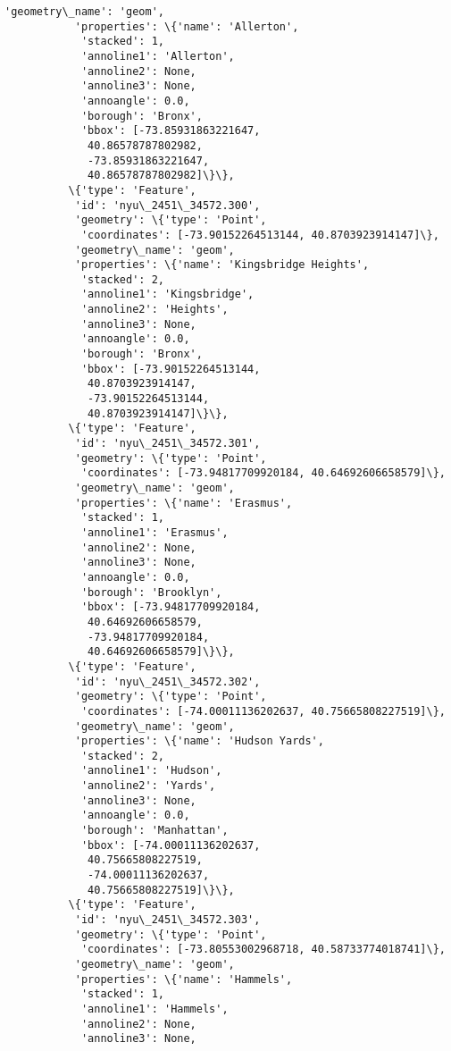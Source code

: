 \documentclass[11pt]{article}
\begin{document}
\begin{Verbatim}[commandchars=\\\{\}]
           'geometry\_name': 'geom',
           'properties': \{'name': 'Allerton',
            'stacked': 1,
            'annoline1': 'Allerton',
            'annoline2': None,
            'annoline3': None,
            'annoangle': 0.0,
            'borough': 'Bronx',
            'bbox': [-73.85931863221647,
             40.86578787802982,
             -73.85931863221647,
             40.86578787802982]\}\},
          \{'type': 'Feature',
           'id': 'nyu\_2451\_34572.300',
           'geometry': \{'type': 'Point',
            'coordinates': [-73.90152264513144, 40.8703923914147]\},
           'geometry\_name': 'geom',
           'properties': \{'name': 'Kingsbridge Heights',
            'stacked': 2,
            'annoline1': 'Kingsbridge',
            'annoline2': 'Heights',
            'annoline3': None,
            'annoangle': 0.0,
            'borough': 'Bronx',
            'bbox': [-73.90152264513144,
             40.8703923914147,
             -73.90152264513144,
             40.8703923914147]\}\},
          \{'type': 'Feature',
           'id': 'nyu\_2451\_34572.301',
           'geometry': \{'type': 'Point',
            'coordinates': [-73.94817709920184, 40.64692606658579]\},
           'geometry\_name': 'geom',
           'properties': \{'name': 'Erasmus',
            'stacked': 1,
            'annoline1': 'Erasmus',
            'annoline2': None,
            'annoline3': None,
            'annoangle': 0.0,
            'borough': 'Brooklyn',
            'bbox': [-73.94817709920184,
             40.64692606658579,
             -73.94817709920184,
             40.64692606658579]\}\},
          \{'type': 'Feature',
           'id': 'nyu\_2451\_34572.302',
           'geometry': \{'type': 'Point',
            'coordinates': [-74.00011136202637, 40.75665808227519]\},
           'geometry\_name': 'geom',
           'properties': \{'name': 'Hudson Yards',
            'stacked': 2,
            'annoline1': 'Hudson',
            'annoline2': 'Yards',
            'annoline3': None,
            'annoangle': 0.0,
            'borough': 'Manhattan',
            'bbox': [-74.00011136202637,
             40.75665808227519,
             -74.00011136202637,
             40.75665808227519]\}\},
          \{'type': 'Feature',
           'id': 'nyu\_2451\_34572.303',
           'geometry': \{'type': 'Point',
            'coordinates': [-73.80553002968718, 40.58733774018741]\},
           'geometry\_name': 'geom',
           'properties': \{'name': 'Hammels',
            'stacked': 1,
            'annoline1': 'Hammels',
            'annoline2': None,
            'annoline3': None,

\end{Verbatim}
\end{document}
